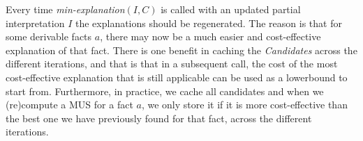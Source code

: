 Every time \textit{min-explanation$(I,C)$} is called with an updated partial interpretation $I$ the explanations should be regenerated. The reason is that for some derivable facts $a$, there may now be a much easier and cost-effective explanation of that fact.
There is one benefit in caching the \textit{Candidates} across the different iterations, and that is that in a subsequent call, the cost of the most cost-effective explanation that is still applicable can be used as a lowerbound to start from.
Furthermore, in practice, we cache all candidates and when we (re)compute a MUS for a fact $a$, we only store it if it is more cost-effective than the best one we have previously found for that fact, across the different iterations.


% 

